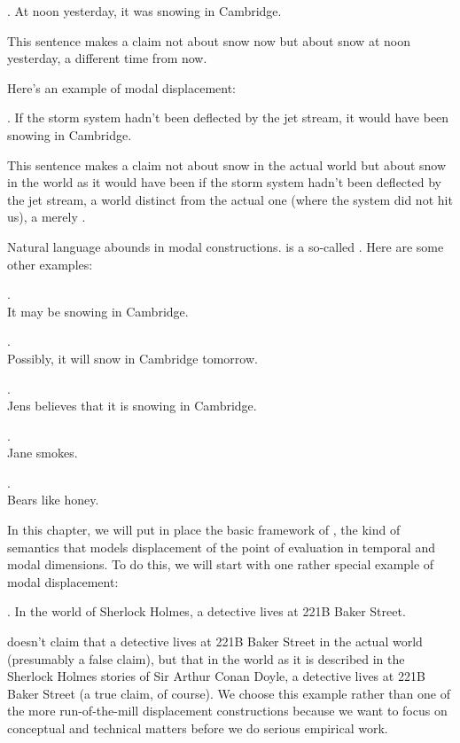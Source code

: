 \ex. At noon yesterday, it was snowing in Cambridge.

This sentence makes a claim not about snow now but about snow at noon
yesterday, a different time from now.

Here's an example of modal displacement:

\ex. If the storm system hadn't been deflected by the jet stream, it
would have been snowing in Cambridge.

This sentence makes a claim not about snow in the actual world but
about snow in the world as it would have been if the storm system
hadn't been deflected by the jet stream, a world distinct from the
actual one (where the system did not hit us), a merely .

Natural %
%
language abounds in modal constructions. \Last is a so-called
. Here are some other examples:

\ex. \\
It may be snowing in Cambridge.

\ex. \\
Possibly, it will snow in Cambridge tomorrow.

\ex. \\
Jens believes that it is snowing in Cambridge.

\ex. \\
Jane smokes.

\ex. \\
Bears like honey.


In this chapter, we will put in place the basic framework of
, the kind of semantics that models
displacement of the point of evaluation in temporal and modal
dimensions. To do this, we will start with one rather special example
of modal displacement:

\ex.\label{sherlock} In the world of Sherlock Holmes, a detective
lives at 221B Baker Street.

\Last{} doesn't claim that a
detective lives at 221B Baker Street in the actual world (presumably a
false claim), but that in the world as it is described in the Sherlock
Holmes stories of Sir Arthur Conan Doyle, a detective lives at 221B
Baker Street (a true claim, of course). We choose this example rather
than one of the more run-of-the-mill displacement constructions
because we want to focus on conceptual and technical matters before we
do serious empirical work.

